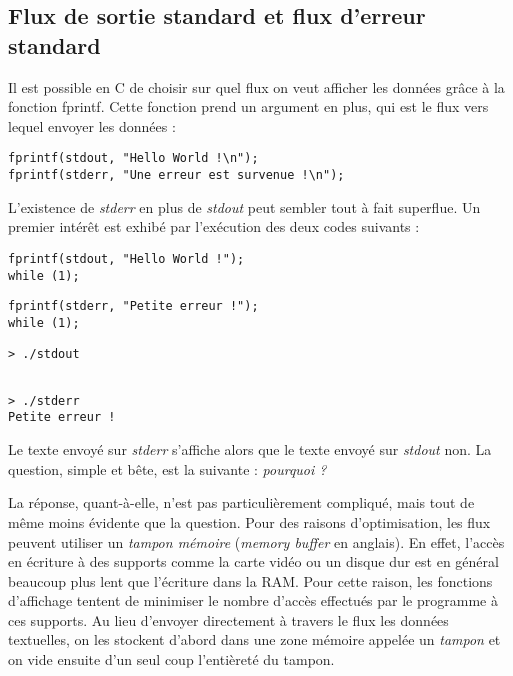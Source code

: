 \documentclass[../../../main.tex]{subfiles}
\begin{document}
\subsection{Flux de sortie standard et flux d'erreur standard}
Il est possible en C de choisir sur quel flux on veut afficher les données grâce à la fonction \textsf{fprintf}. Cette fonction prend un argument en plus, qui est le flux vers lequel envoyer les données :
\begin{verbatim}
fprintf(stdout, "Hello World !\n");
fprintf(stderr, "Une erreur est survenue !\n");
\end{verbatim}
L'existence de \textit{stderr} en plus de \textit{stdout} peut sembler tout à fait superflue. Un premier intérêt est exhibé par l'exécution des deux codes suivants :  

\begin{minipage}{0.5\textwidth}
\begin{verbatim}
fprintf(stdout, "Hello World !");
while (1);
\end{verbatim}
\end{minipage}
\begin{minipage}{0.5\textwidth}
\begin{verbatim}
fprintf(stderr, "Petite erreur !");
while (1);
\end{verbatim}
\end{minipage}

\begin{minipage}{0.5\textwidth}
\begin{verbatim}
> ./stdout


\end{verbatim}
\end{minipage}
\begin{minipage}{0.5\textwidth}
\begin{verbatim}
> ./stderr
Petite erreur !

\end{verbatim}
\end{minipage}
 
Le texte envoyé sur \textit{stderr} s'affiche alors que le texte envoyé sur \textit{stdout} non. La question, simple et bête, est la suivante : \textit{pourquoi ?}
 
La réponse, quant-à-elle, n'est pas particulièrement compliqué, mais tout de même moins évidente que la question.\newline
Pour des raisons d'optimisation, les flux peuvent utiliser un \textit{tampon mémoire} (\textit{memory buffer} en anglais). En effet, l'accès en écriture à des supports comme la carte vidéo ou un disque dur est en général beaucoup plus lent que l'écriture dans la RAM. Pour cette raison, les fonctions d'affichage tentent de minimiser le nombre d'accès effectués par le programme à ces supports. Au lieu d'envoyer directement à travers le flux les données textuelles, on les stockent d'abord dans une zone mémoire appelée un \textit{tampon} et on vide ensuite d'un seul coup l'entièreté du tampon.
 
\end{document}
